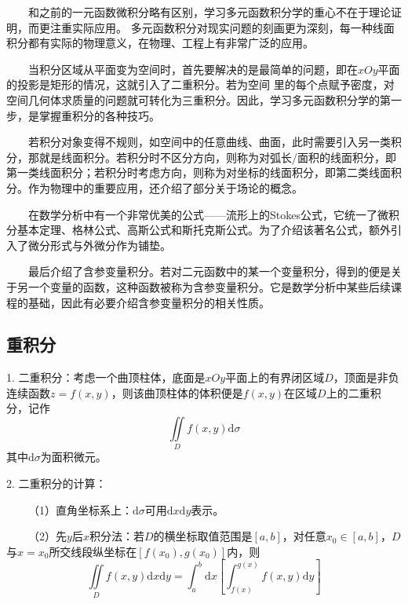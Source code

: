 \begin{tcolorbox}[colback=red!5,colframe=red!75!black]
    ~~~~和之前的一元函数微积分略有区别，学习多元函数积分学的重心不在于理论证明，而更注重实际应用。
   多元函数积分对现实问题的刻画更为深刻，每一种线面积分都有实际的物理意义，在物理、工程上有非常广泛的应用。

    ~~~~当积分区域从平面变为空间时，首先要解决的是最简单的问题，即在$xOy$平面的投影是矩形的情况，这就引入了二重积分。若为空间
    里的每个点赋予密度，对空间几何体求质量的问题就可转化为三重积分。因此，学习多元函数积分学的第一步，是掌握重积分的各种技巧。

    ~~~~若积分对象变得不规则，如空间中的任意曲线、曲面，此时需要引入另一类积分，那就是线面积分。若积分时不区分方向，则称为对弧长/面积的线面积分，即
    第一类线面积分；若积分时考虑方向，则称为对坐标的线面积分，即第二类线面积分。作为物理中的重要应用，还介绍了部分关于场论的概念。

    ~~~~在数学分析中有一个非常优美的公式——流形上的Stokes公式，它统一了微积分基本定理、格林公式、高斯公式和斯托克斯公式。为了介绍该著名公式，额外引入了微分形式与外微分作为铺垫。

    ~~~~最后介绍了含参变量积分。若对二元函数中的某一个变量积分，得到的便是关于另一个变量的函数，这种函数被称为含参变量积分。它是数学分析中某些后续课程的基础，因此有必要介绍含参变量积分的相关性质。
\end{tcolorbox}

\subsection{重积分}

1. 二重积分：考虑一个曲顶柱体，底面是$xOy$平面上的有界闭区域$D$，顶面是非负连续函数$z=f(x,y)$，则该曲顶柱体的体积便是$f(x,y)$在区域$D$上的二重积分，记作
\begin{equation*}
    \iint\limits_D f(x,y)\mathrm{d} \sigma
\end{equation*}
其中$\mathrm{d}\sigma$为面积微元。

2. 二重积分的计算：

~~~~（1）直角坐标系上：$\mathrm{d}\sigma$可用$\mathrm{d}x\mathrm{d}y$表示。

~~~~（2）先$y$后$x$积分法：若$D$的横坐标取值范围是$[a,b]$，对任意$x_0\in [a,b]$，$D$与$x=x_0$所交线段纵坐标在$[f(x_0),g(x_0)]$内，则
\begin{equation*}
    \iint\limits_{D}f(x,y)\mathrm{d}x\mathrm{d}y=\int_a^b\mathrm{d}x\left[\int_{f(x)}^{g(x)}f(x,y)\mathrm{d} y\right]
\end{equation*}

